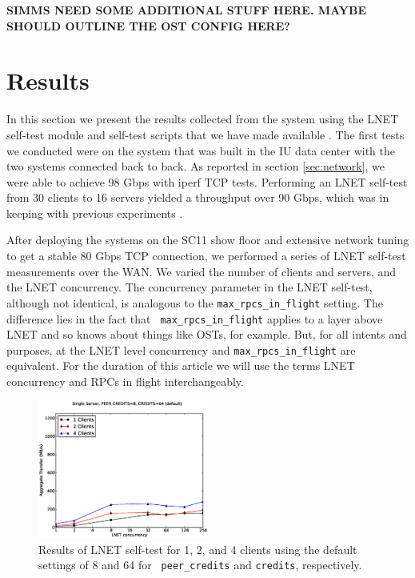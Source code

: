 \documentclass[]{sigplan-proc}
\begin{document}
{\bf SIMMS NEED SOME ADDITIONAL STUFF HERE. MAYBE SHOULD OUTLINE THE OST CONFIG HERE?}

\section{Results}\label{sec:results}

In this section we present the results collected from the system using the LNET self-test module and self-test
scripts that we have made available \cite{lstgithub2011}. The first tests we conducted were on the system that
was built in the IU data center with the two systems connected back to back. As reported in section
\ref{sec:network}, we were able to achieve 98 Gbps with iperf TCP tests. Performing an LNET self-test from 30
clients to 16 servers yielded a throughput over 90 Gbps, which was in keeping with previous experiments
\cite{ssimms2011}.

After deploying the systems on the SC11 show floor and extensive network tuning to get a stable 80 Gbps TCP
connection, we performed a series of LNET self-test measurements over the WAN. We varied the number of clients
and servers, and the LNET concurrency. The concurrency parameter in the LNET self-test, although not
identical, is analogous to the {\tt max\_rpcs\_in\_flight} setting. The difference lies in the fact that {\tt
  max\_rpcs\_in\_flight} applies to a layer above LNET and so knows about things like OSTs, for example. But,
for all intents and purposes, at the LNET level concurrency and {\tt max\_rpcs\_in\_flight} are
equivalent. For the duration of this article we will use the terms LNET concurrency and RPCs in flight
interchangeably.  

\begin{figure}
\centering
\includegraphics[width=0.50\textwidth]{figures/default_pc_plot.eps}
\caption{Results of LNET self-test for 1, 2, and 4 clients using the default settings of 8 and 64 for {\tt
    peer\_credits} and {\tt credits}, respectively.}
\label{fig:default}
\end{figure}
\end{document}
